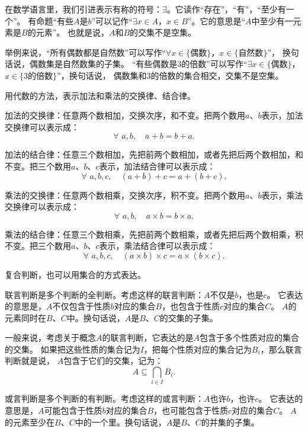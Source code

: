 \documentclass[12pt,UTF8,fontset=none]{ctexbook}
\begin{document}
在数学语言里，我们引进表示有称的符号：$\exists$。它读作“存在”，“有”，“至少有一个”。
有命题“有些$A$是$b$”可以记作“$\exists x \in A$，$x \in B$”。它的意思是“$A$中至少有一元素是$B$的元素”。
也就是说，$A$和$B$的交集不是空集。

举例来说，“所有偶数都是自然数”可以写作“$\forall x \in \{\mbox{偶数}\}$，$x \in \{\mbox{自然数}\}$”，
换句话说，偶数集是自然数集的子集。
“有些偶数是$3$的倍数”可以写作“$\exists x \in \{\mbox{偶数}\}$，$x \in \{3\mbox{的倍数}\}$”，换句话说，
偶数集和$3$的倍数的集合相交，交集不是空集。

\begin{et}
    用代数的方法，表示加法和乘法的交换律、结合律。
\end{et}

\begin{so}
    加法的交换律：任意两个数相加，交换次序，和不变。把两个数用$a$、$b$表示，加法交换律可以表示成：
    $$ \forall \,\, a, b, \quad a + b = b + a. $$
    
    加法的结合律：任意三个数相加，先把前两个数相加，或者先把后两个数相加，和不变。把三个数用$a$、$b$、$c$表示，加法结合律可以表示成：
    $$ \forall \,\, a, b, c, \quad (a + b) + c = a + (b + c). $$
    
    乘法的交换律：任意两个数相乘，交换次序，积不变。把两个数用$a$、$b$表示，乘法交换律可以表示成：
    $$ \forall \,\, a, b, \quad a \times b = b \times a. $$
    
    乘法的结合律：任意三个数相乘，先把前两个数相乘，或者先把后两个数相乘，积不变。把三个数用$a$、$b$、$c$表示，乘法结合律可以表示成：
    $$ \forall \,\, a, b, c, \quad (a \times b) \times c = a \times (b \times c). $$
\end{so}

复合判断，也可以用集合的方式表达。

联言判断是多个判断的全判断。考虑这样的联言判断：$A$不仅是$b$，也是$c$。
它表达的意思是，$A$不仅包含于性质$b$对应的集合$B$，也包含于性质$c$对应的集合$C$。
$A$的元素同时在$B$、$C$中。换句话说，$A$是$B$、$C$的交集的子集。

一般来说，考虑关于概念$A$的联言判断，它表达的是$A$包含于多个性质对应的集合的交集。
如果把这些性质的集合记为$I$，把每个性质对应的集合记为$B_i$，那么联言判断就是说，
$A$包含于它们的交集，记为：
$$ A \subseteq \bigcap_{i\in I} B_i. $$

或言判断是多个判断的有判断。考虑这样的或言判断：$A$也许$b$，也许$c$。
它表达的意思是，$A$可能包含于性质$b$对应的集合$B$，也可能包含于性质$c$对应的集合$C$。
$A$的元素至少在$B$、$C$中的一个里。换句话说，$A$是$B$、$C$的并集的子集。
\end{document}
